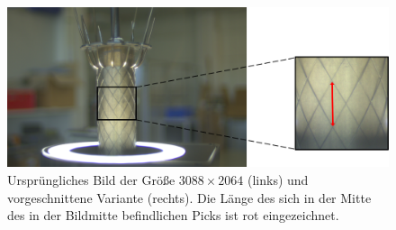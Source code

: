 \begin{figure}[ht!]
\centering
\includegraphics[width=12cm]{98_images/stent_normal_cropped.png}
\caption{Ursprüngliches Bild der Größe $3088 \times 2064$ (links) und vorgeschnittene Variante (rechts). Die Länge des sich in der Mitte des in der Bildmitte befindlichen Picks ist rot eingezeichnet.}
\label{fig:bild_normal_vorgeschnitten}
\end{figure}








